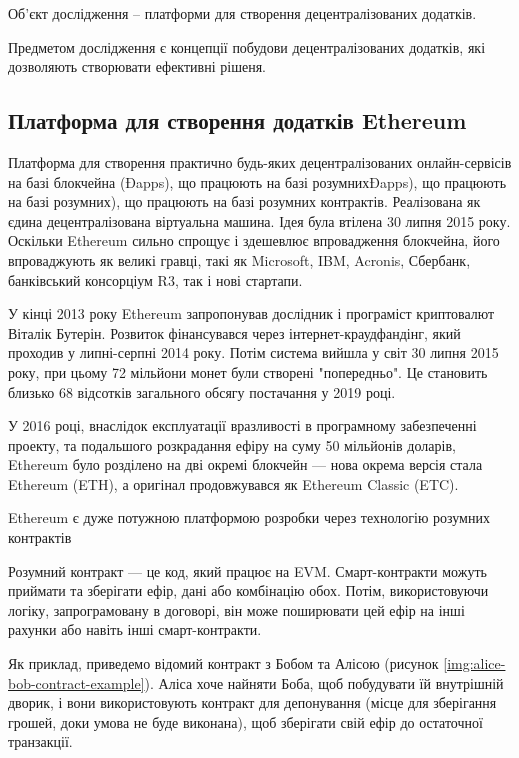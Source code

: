 \documentclass{lib/styles/default-style}
\begin{document}
    Об'єкт дослідження – платформи для створення децентралізованих додатків.

    Предметом дослідження є концепції побудови децентралізованих додатків, які дозволяють створювати ефективні рішеня.


\subsection{Платформа для створення додатків Ethereum}

    Платформа для створення практично будь-яких децентралізованих
    онлайн-сервісів на базі блокчейна (Đapps), що працюють на базі розумнихĐapps), що працюють на базі розумних), що працюють на базі розумних
    контрактів. Реалізована як єдина децентралізована віртуальна машина. Ідея була
    втілена 30 липня 2015 року. Оскільки Ethereum сильно спрощує і здешевлює
    впровадження блокчейна, його впроваджують як великі гравці, такі як Microsoft, IBM, Acronis,
    Сбербанк, банківський консорціум R3, так і нові стартапи.

    У кінці 2013 року Ethereum запропонував дослідник
    і програміст криптовалют Віталік Бутерін. Розвиток фінансувався через інтернет-краудфандінг, який проходив
    у липні-серпні 2014 року. Потім система вийшла у світ 30 липня 2015 року, при цьому 72 мільйони монет були
    створені "попередньо". Це становить близько 68 відсотків загального обсягу постачання у 2019 році.

    У 2016 році,
    внаслідок експлуатації вразливості в програмному забезпеченні проекту, та подальшого розкрадання ефіру на суму 
    50 мільйонів доларів, Ethereum було розділено на дві окремі блокчейн --- нова окрема версія стала Ethereum (ETH), а оригінал продовжувався 
    як Ethereum Classic (ETC).

    Ethereum є дуже потужною платформою розробки через технологію розумних контрактів

    Розумний контракт --- це код, який працює на EVM.
    Смарт-контракти можуть приймати та зберігати ефір, дані або комбінацію обох.
    Потім, використовуючи логіку, запрограмовану в договорі, він може поширювати
    цей ефір на інші рахунки або навіть інші смарт-контракти.

    Як приклад, приведемо відомий контракт з Бобом та Алісою (рисунок \ref{img:alice-bob-contract-example}). Аліса хоче найняти Боба, щоб побудувати їй внутрішній дворик,
    і вони використовують контракт для депонування (місце для зберігання грошей, доки умова не буде виконана),
    щоб зберігати свій ефір до остаточної транзакції.
\end{document}

